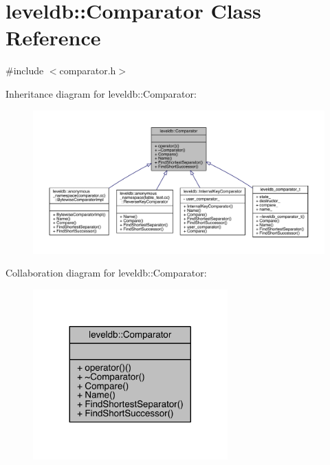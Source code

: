 \hypertarget{structleveldb_1_1_comparator}{}\section{leveldb\+:\+:Comparator Class Reference}
\label{structleveldb_1_1_comparator}


{\ttfamily \#include $<$comparator.\+h$>$}



Inheritance diagram for leveldb\+:\+:Comparator\+:
\nopagebreak
\begin{figure}[H]
\begin{center}
\leavevmode
\includegraphics[width=350pt]{structleveldb_1_1_comparator__inherit__graph}
\end{center}
\end{figure}


Collaboration diagram for leveldb\+:\+:Comparator\+:\nopagebreak
\begin{figure}[H]
\begin{center}
\leavevmode
\includegraphics[width=212pt]{structleveldb_1_1_comparator__coll__graph}
\end{center}
\end{figure}
